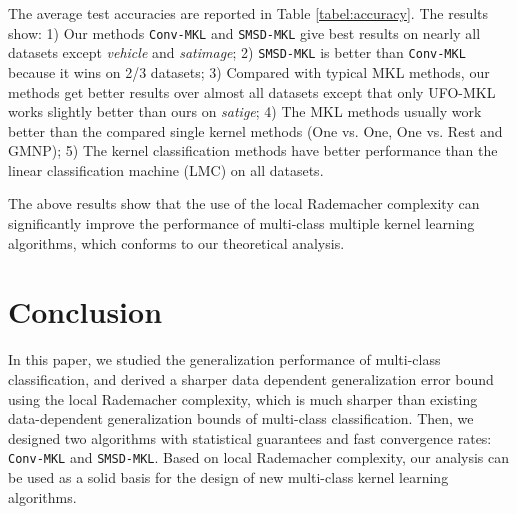 \documentclass{article}
\begin{document}
The average test accuracies are reported in Table \ref{tabel:accuracy}.
The results show:
1) Our methods \texttt{Conv-MKL} and \texttt{SMSD-MKL} give best results on nearly all datasets
except \textit{vehicle} and \textit{satimage};
2) \texttt{SMSD-MKL} is better than \texttt{Conv-MKL} because it wins on 2/3 datasets;
3) Compared with typical MKL methods,
our methods get better results over almost all datasets except that only UFO-MKL works slightly better than ours on \textit{satige};
4) The MKL methods usually work better than the compared single kernel methods (One vs. One, One vs. Rest and GMNP);
5) The kernel classification methods have better performance than the linear classification machine (LMC) on all datasets.

The above results show that the use of the local Rademacher complexity can significantly improve
the performance of multi-class multiple kernel learning algorithms,
which conforms to our theoretical analysis.


\section{Conclusion}
In this paper, we studied the generalization performance of multi-class classification,
and derived a sharper data dependent generalization error bound using the local Rademacher complexity,
which is much sharper than existing data-dependent generalization bounds of multi-class classification.
Then, we designed two algorithms with statistical guarantees and fast convergence rates:
\texttt{Conv-MKL} and \texttt{SMSD-MKL}.
Based on local Rademacher complexity, our analysis can be used as a solid basis for the
design of new multi-class kernel learning algorithms.

\end{document}
